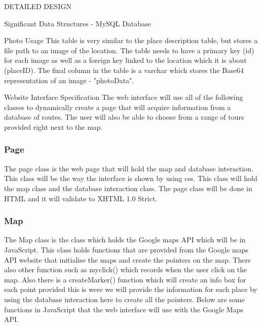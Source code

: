 \documentclass{article}
\begin{document}
\begin{section}{DETAILED DESIGN}
\begin{subsection}{Significant Data Structures - MySQL Database}
		\begin{subsubsection}{Photo Usage}
			This table is very similar to the place description table, but stores a file path to an image of the location. The table needs to have a primary key (id) for each image as well as a foreign key linked to the location which it is about (placeID). The final column in the table is a varchar which stores the Base64 representation of an image - "photoData".
		\end{subsubsection}
	\end{subsection}
	
	\begin{subsection}{Website Interface Specification}
		The web interface will use all of the following classes to dynamically create a page that will acquire information from a database of routes. The user will also be able to choose from a range of tours provided right next to the map. 

		\subsubsection{Page}
			The page class is the web page that will hold the map and database interaction. This class will be the way the interface is shown by using css. This class will hold the map class and the database interaction class. The page class will be done in HTML and it will validate to XHTML 1.0 Strict. 

		\subsubsection{Map}
			The Map class is the class which holds the Google maps API which will be in JavaScript. This class holds functions that are provided from the Google maps API website that initialise the maps and create the pointers on the map. There also other function such as myclick() which records when the user click on the map. Also there is a createMarker() function which will create an info box for each point provided this is were we will provide the information for each place by using the database interaction here to create all the pointers. Below are some functions in JavaScript that the web interface will use with the Google Maps API.


\end{subsection}
\end{section}
\end{document}
